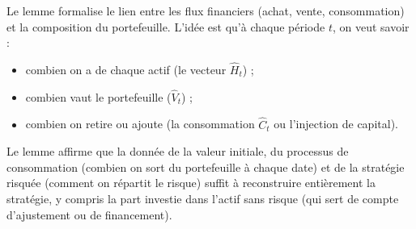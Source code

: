 \begin{remarque}
Le lemme formalise le lien entre les flux financiers (achat, vente, consommation) et la composition du portefeuille.
L'idée est qu'à chaque période $t$, on veut savoir :
\begin{itemize}
    \item combien on a de chaque actif (le vecteur $\hat H_t$) ;
    \item combien vaut le portefeuille ($\hat V_t$) ;
    \item combien on retire ou ajoute (la consommation $\hat C_t$ ou l'injection de capital).
\end{itemize}
Le lemme affirme que la donnée de la valeur initiale, du processus de consommation (combien on sort du portefeuille à chaque date) et de la stratégie risquée (comment on répartit le risque) suffit à reconstruire entièrement la stratégie, y compris la part investie dans l'actif sans risque (qui sert de compte d'ajustement ou de financement).
\end{remarque}


